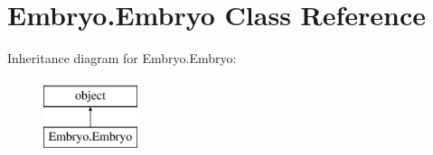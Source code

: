 \hypertarget{class_embryo_1_1_embryo}{}\section{Embryo.\+Embryo Class Reference}
\label{class_embryo_1_1_embryo}
Inheritance diagram for Embryo.\+Embryo\+:\begin{figure}[H]
\begin{center}
\leavevmode
\includegraphics[height=2.000000cm]{class_embryo_1_1_embryo}
\end{center}
\end{figure}
